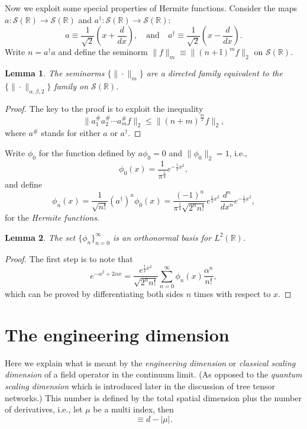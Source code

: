 \documentclass[prl,twocolumn,lengthcheck,superscriptaddress]{revtex4-1}
\newtheorem{lemma}{Lemma}
\theoremstyle{definition}
\theoremstyle{remark}
\begin{document}
Now we exploit some special properties of Hermite functions. Consider the maps $a:\mathscr{S}(\mathbb{R})\rightarrow \mathscr{S}(\mathbb{R})$ and $a^\dag:\mathscr{S}(\mathbb{R})\rightarrow \mathscr{S}(\mathbb{R})$:
\begin{equation}
	a \equiv \frac{1}{\sqrt{2}}\left(x+ \frac{d}{dx}\right), \quad \text{and} \quad a^\dag \equiv \frac{1}{\sqrt{2}}\left(x- \frac{d}{dx}\right).
\end{equation}
Write $n = a^\dag a$ and define the seminorm $\|f\|_m \equiv \|(n+\mathbb{I})^m f\|_2$ on $\mathscr{S}(\mathbb{R})$.
\begin{lemma}
	The seminorms $\{\|\cdot\|_m\}$ are a directed family equivalent to the $\{\|\cdot\|_{\alpha,\beta,2}\}$ family on $\mathscr{S}(\mathbb{R})$.
\end{lemma}
\begin{proof}
	The key to the proof is to exploit the inequality
	\begin{equation}
		\|a_1^{\#}a_2^{\#}\cdots a_m^{\#}f\|_2 \le \|(n+m)^{\frac{m}{2}}f\|_2,
	\end{equation}
	where $a^{\#}$ stands for either $a$ or $a^\dag$.
\end{proof}

Write $\phi_0$ for the function defined by $a\phi_0 = 0$ and $\|\phi_0\|_2 = 1$, i.e., 
\begin{equation}
	\phi_0(x) = \frac{1}{\pi^{\frac14}} e^{-\frac12 x^2},
\end{equation} 
and define
\begin{equation}
	\phi_n(x) = \frac{1}{\sqrt{n!}} (a^\dag)^n \phi_0(x) = \frac{(-1)^n}{\pi^{\frac14}\sqrt{2^n n!}} e^{\frac12 x^2}\frac{d^n}{dx^n}e^{-\frac12 x^2},
\end{equation}
for the \emph{Hermite functions}.
\begin{lemma}
	The set $\{\phi_n\}_{n=0}^{\infty}$ is an orthonormal basis for $L^2(\mathbb{R})$.
\end{lemma}
\begin{proof}
	The first step is to note that 
	\begin{equation}
		e^{-\alpha^2+2\alpha x} = \frac{e^{\frac{1}{2}x^2}}{\sqrt{2^n n!}}\sum_{n=0}^{\infty} \phi_n(x)  \frac{\alpha^n}{n!},
	\end{equation}
	which can be proved by differentiating both sides $n$ times with respect to $x$.
\end{proof}


\section{The engineering dimension}
Here we explain what is meant by the \emph{engineering dimension} or \emph{classical scaling dimension} of a field operator in the continuum limit. (As opposed to the \emph{quantum scaling dimension} which is introduced later in the discussion of tree tensor networks.) This number is defined by the total spatial dimension plus the number of derivatives, i.e., let $\mu$ be a multi index, then 
\begin{equation}
	[D^\mu \widehat{\phi}(f)] \equiv {d} - |\mu|. 
\end{equation}
\end{document}
